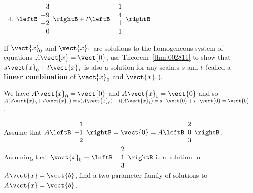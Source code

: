 \begin{multicols}{2}
\begin{ex}
\begin{sol}
\begin{enumerate}[label={\alph*.}]
\setcounter{enumi}{3}
\item
$\leftB \begin{array}{r}
3 \\
-9 \\
-2 \\
0
\end{array} \rightB + t \leftB \begin{array}{r}
-1 \\
4 \\
1 \\
1
\end{array} \rightB$


\end{enumerate}
\end{sol}
\end{ex}

\begin{ex}
If $\vect{x}_{0}$ and $\vect{x}_{1}$ are solutions to the homogeneous system of equations $A\vect{x} = \vect{0}$, use Theorem~\ref{thm:002811} to show that $s\vect{x}_{0} + t\vect{x}_{1}$ is also a solution for any scalars $s$ and $t$ (called a \textbf{linear combination} of $\vect{x}_{0}$ and $\vect{x}_{1}$).

\begin{sol}
We have $A\vect{x}_{0} = \vect{0}$ and $A\vect{x}_{1} = \vect{0}$ and so $A(s\vect{x}_{0} + t\vect{x}_{1}) = s(A\vect{x}_{0}) + t(A\vect{x}_{1}) = s \cdot \vect{0} + t \cdot \vect{0} = \vect{0}$.
\end{sol}
\end{ex}

\begin{ex}
Assume that $A \leftB \begin{array}{r}
1 \\
-1 \\
2
\end{array} \rightB = \vect{0} = A \leftB \begin{array}{r}
2 \\
0 \\
3
\end{array} \rightB$. Assuming that $\vect{x}_{0} = \leftB \begin{array}{r}
2 \\
-1 \\
3
\end{array} \rightB$ is a solution to $A\vect{x} = \vect{b}$, find a two-parameter family of solutions to $A\vect{x} = \vect{b}$.
\end{ex}


\end{multicols}
